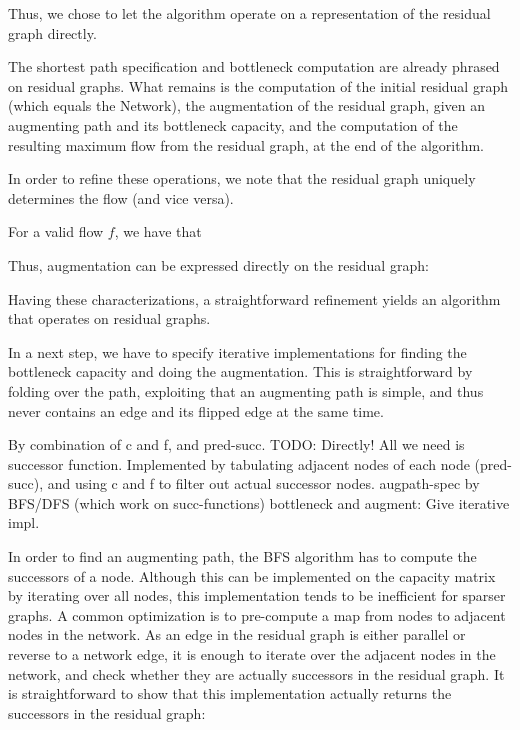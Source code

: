 \documentclass{llncs}
\begin{document}
  Thus, we chose to let the algorithm operate on a representation of the residual graph directly.
  
      The shortest path specification and bottleneck computation are already 
      phrased on residual graphs. What remains is the computation of the initial residual graph (which equals the Network),
      the augmentation of the residual graph, given an augmenting path and its bottleneck capacity, and the computation of the 
      resulting maximum flow from the residual graph, at the end of the algorithm.
      
      In order to refine these operations, we note that the residual graph uniquely determines the flow (and vice versa). 

      For a valid flow $f$, we have that
        
      Thus, augmentation can be expressed directly on the residual graph:
      
      Having these characterizations, a straightforward refinement yields an algorithm that operates on residual graphs.

      In a next step, we have to specify iterative implementations for finding the bottleneck capacity and doing the augmentation.
      This is straightforward by folding over the path, exploiting that an augmenting path is simple, and thus never contains an edge 
      and its flipped edge at the same time. 
      
      
      By combination of c and f, and pred-succ. TODO: Directly!
        All we need is successor function. Implemented by tabulating 
          adjacent nodes of each node (pred-succ), and using c and f to filter out actual successor nodes. 
      augpath-spec by BFS/DFS (which work on succ-functions)
      bottleneck and augment: Give iterative impl.
      
    
      In order to find an augmenting path, the BFS algorithm has to compute the successors of a node. 
      Although this can be implemented on the capacity matrix by iterating over all nodes, this implementation tends to be inefficient for sparser graphs.
      A common optimization is to pre-compute a map from nodes to adjacent nodes in the network. As an edge in the residual graph is either parallel or reverse to 
      a network edge, it is enough to iterate over the adjacent nodes in the network, and check whether they are actually successors in the residual graph.
      It is straightforward to show that this implementation actually returns the successors in the residual graph:
\end{document}
